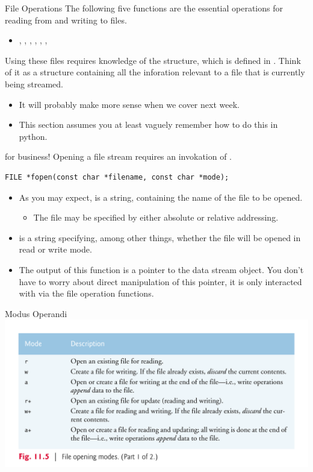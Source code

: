 \documentclass[11pt]{beamer}
\let\OldTexttt\texttt
\renewcommand{\texttt}[1]{\OldTexttt{\color{teal}{#1}}}
\begin{document}
\begin{frame}{File Operations}
The following five functions are the essential operations for reading from and writing to files.  
\begin{itemize}
\item \texttt{fopen()}, \texttt{fclose()}, \texttt{fscanf()}, \texttt{fread()}, \texttt{fwrite()}, \texttt{fprintf}, \texttt{feof()}
\end{itemize}
Using these files requires knowledge of the \texttt{FILE} structure, which is defined in \texttt{<stdio.h>}.  Think of it as a structure containing all the inforation relevant to a file that is currently being streamed. 
\begin{itemize}
\item It will probably make more sense when we cover \texttt{struct} next week.
\item This section assumes you at least vaguely remember how to do this in python.  
\end{itemize}
\end{frame}

\begin{frame}[fragile=singleslide]{\texttt{fopen()} for business!}
Opening a file stream requires an invokation of \texttt{fopen()}.
\begin{lstlisting}[style=C]
FILE *fopen(const char *filename, const char *mode);
\end{lstlisting}
\begin{itemize}
\item As you may expect, \texttt{filename} is a string, containing the name of the file to be opened.
\begin{itemize}
\item The file may be specified by either absolute or relative addressing.  
\end{itemize}
\item \texttt{mode} is a string specifying, among other things, whether the file will be opened in read or write mode.  
\item The output of this function is a \texttt{FILE} pointer to the data stream object.  You don't have to worry about direct manipulation of this pointer, it is only interacted with via the file operation functions.  
\end{itemize}
\end{frame}

\begin{frame}{Modus Operandi}
\center
\includegraphics[scale=0.12]{modes.png}
\end{frame}
\end{document}
